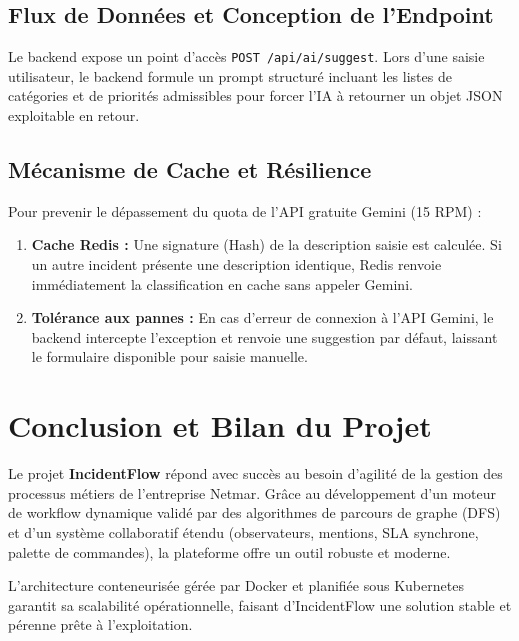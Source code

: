\documentclass[12pt,a4paper]{article}
\begin{document}
\subsection{Flux de Données et Conception de l'Endpoint}
Le backend expose un point d'accès \texttt{POST /api/ai/suggest}. Lors d'une saisie utilisateur, le backend formule un prompt structuré incluant les listes de catégories et de priorités admissibles pour forcer l'IA à retourner un objet JSON exploitable en retour.

\subsection{Mécanisme de Cache et Résilience}
Pour prevenir le dépassement du quota de l'API gratuite Gemini (15 RPM) :
\begin{enumerate}
    \item \textbf{Cache Redis :} Une signature (Hash) de la description saisie est calculée. Si un autre incident présente une description identique, Redis renvoie immédiatement la classification en cache sans appeler Gemini.
    \item \textbf{Tolérance aux pannes :} En cas d'erreur de connexion à l'API Gemini, le backend intercepte l'exception et renvoie une suggestion par défaut, laissant le formulaire disponible pour saisie manuelle.
\end{enumerate}

\clearpage

\section{Conclusion et Bilan du Projet}
Le projet \textbf{IncidentFlow} répond avec succès au besoin d'agilité de la gestion des processus métiers de l'entreprise Netmar. Grâce au développement d'un moteur de workflow dynamique validé par des algorithmes de parcours de graphe (DFS) et d'un système collaboratif étendu (observateurs, mentions, SLA synchrone, palette de commandes), la plateforme offre un outil robuste et moderne.

L'architecture conteneurisée gérée par Docker et planifiée sous Kubernetes garantit sa scalabilité opérationnelle, faisant d'IncidentFlow une solution stable et pérenne prête à l'exploitation.
\end{document}
